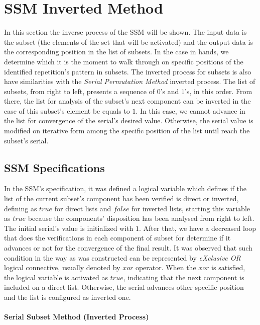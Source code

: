 \documentclass {amsart}
\begin{document}
\section*{SSM Inverted Method}
In this section the inverse process of the SSM will be shown. The input data is the subset (the elements of the set that will be activated) and the output data is the corresponding position in the list of subsets. In the case in hands, we determine which it is the moment to walk through on specific positions of the identified repetition's pattern in subsets. The inverted process for subsets is also have similarities with the \emph{Serial Permutation Method}\cite{me} inverted process. The list of subsets, from right to left, presents a sequence of {$0$}'s and {$1$}'s, in this order. From there, the list for analysis of the subset's next component can be inverted in the case of this subset's element be equals to {$1$}. In this case, we cannot advance in the list for convergence of the serial's desired value. Otherwise, the serial value is modified on iterative form among the specific position of the list until reach the subset's serial.  

\subsection*{SSM Specifications}
In the SSM's specification, it was defined a logical variable which defines if the list of the current subset's component has been verified is direct or inverted, defining as {$true$} for direct lists and {$false$} for inverted lists, starting this variable as {$true$} because the components' disposition has been analysed from right to left. The initial serial's value is initialized with {$1$}. After that, we have a decreased loop that does the verifications in each component of subset for determine if it advances or not for the convergence of the final result. It was observed that such condition in the way as was constructed can be represented by \emph{eXclusive OR} logical connective, usually denoted by {$xor$} operator. When the {$xor$} is satisfied, the logical variable is activated as {$true$}, indicating that the next component is included on a direct list. Otherwise, the serial advances other specific position and the list is configured as inverted one.\\\\
\textbf{Serial Subset Method (Inverted Process)}
\end{document}
